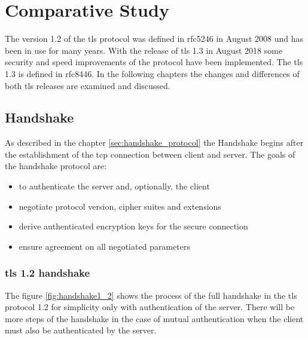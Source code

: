 \chapter{Comparative Study}
\label{chap:comparative_study}

The version 1.2 of the \gls{tls} protocol was defined in \gls{rfc}5246 in August 2008 und has been in use for many years. With the release of \gls{tls} 1.3 in August 2018 some security and speed improvements of the protocol have been implemented. The \gls{tls} 1.3 is defined in \gls{rfc}8446. In the following chapters the changes and differences of both \gls{tls} releases are examined and discussed.

\section{Handshake}
\label{sec:comparison_handshake}

As described in the chapter \ref{sec:handshake_protocol} the Handshake begins after the establishment of the \gls{tcp} connection between client and server. The goals of the handshake protocol are:
\begin{itemize}
\item to authenticate the server and, optionally, the client
\item negotiate protocol version, cipher suites and extensions
\item derive authenticated encryption keys for the secure connection 
\item ensure agreement on all negotiated parameters
\end{itemize}
 \cite{Hassenstein}

\subsection{\gls{tls} 1.2 handshake}
\label{subsec:handshake1_2}

The figure \ref{fig:handshake1_2} shows the process of the full handshake in the \gls{tls} protocol 1.2 for simplicity only with authentication of the server. There will be more steps of the handshake in the case of mutual authentication when the client must also be authenticated by the server.

